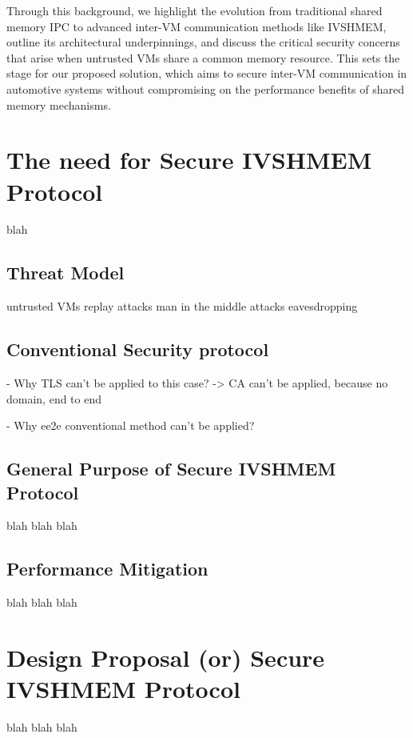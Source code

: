 \documentclass[conference]{IEEEtran}
\begin{document}
Through this background, we highlight the evolution from traditional shared memory IPC to advanced inter-VM communication methods like IVSHMEM, outline its architectural underpinnings, and discuss the critical security concerns that arise when untrusted VMs share a common memory resource. This sets the stage for our proposed solution, which aims to secure inter-VM communication in automotive systems without compromising on the performance benefits of shared memory mechanisms.




\section{The need for Secure IVSHMEM Protocol}

blah

\subsection{Threat Model}


untrusted VMs
replay attacks
man in the middle attacks
eavesdropping


\subsection{Conventional Security protocol}
- Why TLS can't be applied to this case? -> CA can't be applied, because no domain, end to end

- Why ee2e conventional method can't be applied?




\subsection{General Purpose of Secure IVSHMEM Protocol}

blah blah blah

\subsection{Performance Mitigation}

blah blah blah



\section{Design Proposal (or) Secure IVSHMEM Protocol}

blah blah blah
\end{document}
